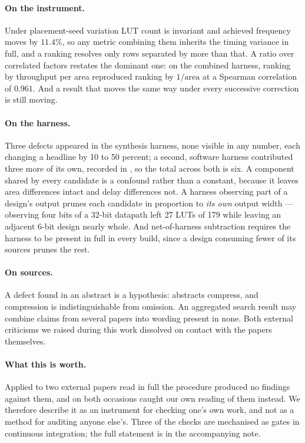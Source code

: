 \paragraph{On the instrument.} Under placement-seed variation LUT count is
invariant and achieved frequency moves by $11.4\%$, so any metric combining them
inherits the timing variance in full, and a ranking resolves only rows separated
by more than that. A ratio over correlated factors restates the dominant one: on
the combined harness, ranking by throughput per area reproduced ranking by
$1/\text{area}$ at a Spearman correlation of $0.961$. And a result that moves the
same way under every successive correction is still moving.

\paragraph{On the harness.} Three defects appeared in the synthesis harness, none
visible in any number, each changing a headline by 10 to 50 percent; a second,
software harness contributed three more of its own, recorded in
, so the total across both is six. A component shared by every
candidate is a confound rather than a constant, because it leaves area
differences intact and delay differences not. A harness observing part of a
design's output prunes each candidate in proportion to \emph{its own} output
width --- observing four bits of a 32-bit datapath left 27 LUTs of 179 while
leaving an adjacent 6-bit design nearly whole. And net-of-harness subtraction
requires the harness to be present in full in every build, since a design
consuming fewer of its sources prunes the rest.

\paragraph{On sources.} A defect found in an abstract is a hypothesis: abstracts
compress, and compression is indistinguishable from omission. An aggregated
search result may combine claims from several papers into wording present in
none. Both external criticisms we raised during this work dissolved on contact
with the papers themselves.


\paragraph{What this is worth.} Applied to two external papers read in full the
procedure produced no findings against them, and on both occasions caught our own
reading of them instead. We
therefore describe it as an instrument for checking one's own work, and not as a
method for auditing anyone else's. Three of the checks are mechanised as gates in
continuous integration; the full statement is in the accompanying note.





